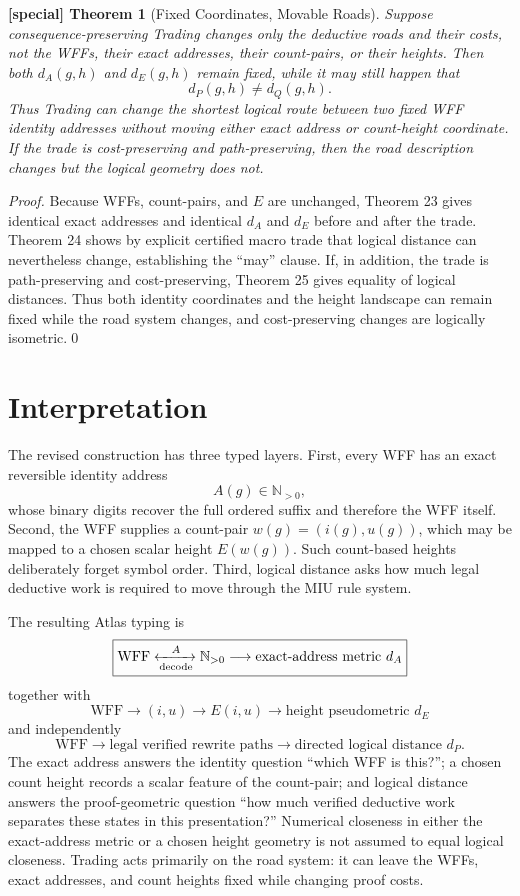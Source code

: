 \documentclass[11pt]{article}
\newtheorem{spthm}{[special] Theorem}
\newcommand{\dA}{d_A}
\newcommand{\dE}{d_E}
\begin{document}
\begin{spthm}[Fixed Coordinates, Movable Roads]
Suppose consequence-preserving Trading changes only the deductive roads and their costs, not the WFFs, their exact addresses, their count-pairs, or their heights. Then both $\dA(g,h)$ and $\dE(g,h)$ remain fixed, while it may still happen that
\[d_P(g,h)\ne d_Q(g,h).\]
Thus Trading can change the shortest logical route between two fixed WFF identity addresses without moving either exact address or count-height coordinate. If the trade is cost-preserving and path-preserving, then the road description changes but the logical geometry does not.
\end{spthm}
\textit{Proof.} Because WFFs, count-pairs, and $E$ are unchanged, Theorem 23 gives identical exact addresses and identical $d_A$ and $d_E$ before and after the trade. Theorem 24 shows by explicit certified macro trade that logical distance can nevertheless change, establishing the ``may'' clause. If, in addition, the trade is path-preserving and cost-preserving, Theorem 25 gives equality of logical distances. Thus both identity coordinates and the height landscape can remain fixed while the road system changes, and cost-preserving changes are logically isometric.\qed


\section{Interpretation}
The revised construction has three typed layers. First, every WFF has an exact reversible identity address
\[
A(g)\in\mathbb N_{>0},
\]
whose binary digits recover the full ordered suffix and therefore the WFF itself. Second, the WFF supplies a count-pair $w(g)=(i(g),u(g))$, which may be mapped to a chosen scalar height $E(w(g))$. Such count-based heights deliberately forget symbol order. Third, logical distance asks how much legal deductive work is required to move through the MIU rule system.

The resulting Atlas typing is
\[
\boxed{
\text{WFF}
\xleftrightarrow[\text{decode}]{A}
\mathbb N_{>0}
\longrightarrow
\text{exact-address metric }d_A
}
\]
together with
\[
\boxed{
\text{WFF}
\longrightarrow
(i,u)
\longrightarrow
E(i,u)
\longrightarrow
\text{height pseudometric }d_E
}
\]
and independently
\[
\boxed{
\text{WFF}
\longrightarrow
\text{legal verified rewrite paths}
\longrightarrow
\text{directed logical distance }d_P
}.
\]
The exact address answers the identity question ``which WFF is this?''; a chosen count height records a scalar feature of the count-pair; and logical distance answers the proof-geometric question ``how much verified deductive work separates these states in this presentation?'' Numerical closeness in either the exact-address metric or a chosen height geometry is not assumed to equal logical closeness. Trading acts primarily on the road system: it can leave the WFFs, exact addresses, and count heights fixed while changing proof costs.
\end{document}
